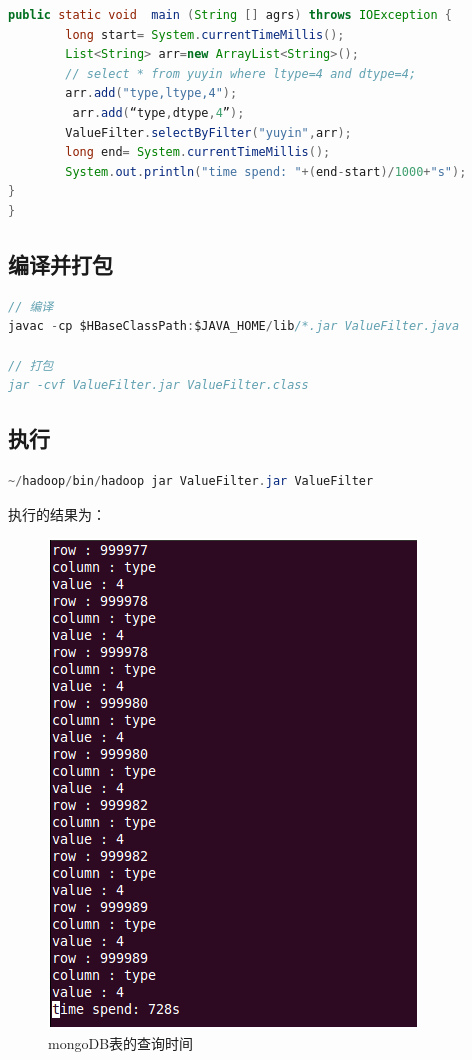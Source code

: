 \begin{lstlisting}[language=Java]
    public static void  main (String [] agrs) throws IOException {
        long start= System.currentTimeMillis();
        List<String> arr=new ArrayList<String>();
        // select * from yuyin where ltype=4 and dtype=4;
        arr.add("type,ltype,4");
		 arr.add(“type,dtype,4”);
        ValueFilter.selectByFilter("yuyin",arr);
        long end= System.currentTimeMillis();
        System.out.println("time spend: "+(end-start)/1000+"s");
}
}
\end{lstlisting}

\subsection{编译并打包}
\begin{lstlisting}[language=Java]
// 编译 
javac -cp $HBaseClassPath:$JAVA_HOME/lib/*.jar ValueFilter.java

// 打包 
jar -cvf ValueFilter.jar ValueFilter.class
\end{lstlisting}

\subsection{执行}
\begin{lstlisting}[language=Java]
~/hadoop/bin/hadoop jar ValueFilter.jar ValueFilter
\end{lstlisting}

执行的结果为：
\begin{figure}[!ht]
\centering
\includegraphics[scale=0.5]{photo/bcjg.png} 
\caption{mongoDB表的查询时间}
\end{figure} 